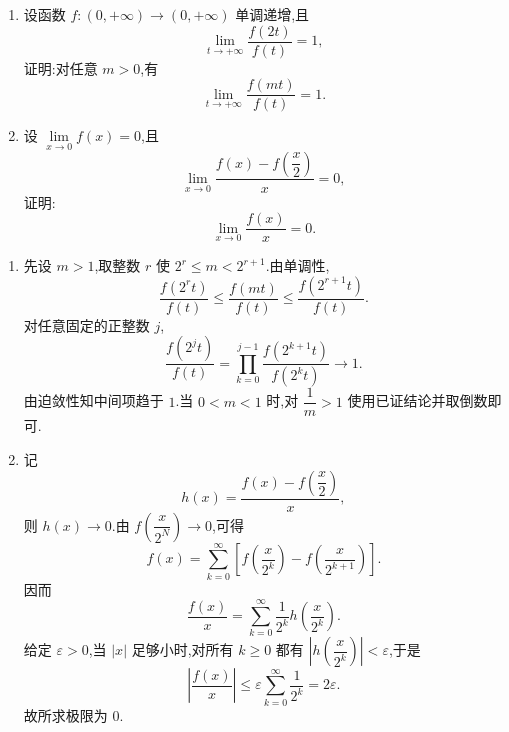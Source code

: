 \begin{example}
    \begin{enumerate}
        \item 设函数 $f:(0,+\infty)\to(0,+\infty)$ 单调递增,且
              \[
                  \displaystyle\lim\limits_{t\to+\infty}\dfrac{f(2t)}{f(t)}=1,
              \]
              证明:对任意 $m>0$,有
              \[
                  \displaystyle\lim\limits_{t\to+\infty}\dfrac{f(mt)}{f(t)}=1.
              \]
        \item 设 $\displaystyle\lim\limits_{x\to0}f(x)=0$,且
              \[
                  \displaystyle\lim\limits_{x\to0}\dfrac{f(x)-f\left(\dfrac{x}{2}\right)}{x}=0,
              \]
              证明:
              \[
                  \displaystyle\lim\limits_{x\to0}\dfrac{f(x)}{x}=0.
              \]
    \end{enumerate}
\end{example}
\exampleblank

\begin{solution}
    \leavevmode
    \begin{enumerate}
        \item 先设 $m>1$,取整数 $r$ 使 $2^r\leq m<2^{r+1}$.由单调性,
              \[
                  \dfrac{f(2^rt)}{f(t)}
                  \leq\dfrac{f(mt)}{f(t)}
                  \leq\dfrac{f(2^{r+1}t)}{f(t)}.
              \]
              对任意固定的正整数 $j$,
              \[
                  \dfrac{f(2^jt)}{f(t)}
                  =\prod\limits_{k=0}^{j-1}\dfrac{f(2^{k+1}t)}{f(2^kt)}
                  \longrightarrow1.
              \]
              由迫敛性知中间项趋于 $1$.当 $0<m<1$ 时,对 $\dfrac{1}{m}>1$ 使用已证结论并取倒数即可.
        \item 记
              \[
                  h(x)=\dfrac{f(x)-f\left(\dfrac{x}{2}\right)}{x},
              \]
              则 $h(x)\to0$.由 $f\left(\dfrac{x}{2^N}\right)\to0$,可得
              \[
                  f(x)=\sum\limits_{k=0}^{\infty}
                  \left[f\left(\dfrac{x}{2^k}\right)-f\left(\dfrac{x}{2^{k+1}}\right)\right].
              \]
              因而
              \[
                  \dfrac{f(x)}{x}
                  =\sum\limits_{k=0}^{\infty}\dfrac{1}{2^k}h\left(\dfrac{x}{2^k}\right).
              \]
              给定 $\varepsilon>0$,当 $|x|$ 足够小时,对所有 $k\geq0$ 都有
              $\left|h\left(\dfrac{x}{2^k}\right)\right|<\varepsilon$,于是
              \[
                  \left|\dfrac{f(x)}{x}\right|
                  \leq\varepsilon\sum\limits_{k=0}^{\infty}\dfrac{1}{2^k}
                  =2\varepsilon.
              \]
              故所求极限为 $0$.
    \end{enumerate}
\end{solution}


